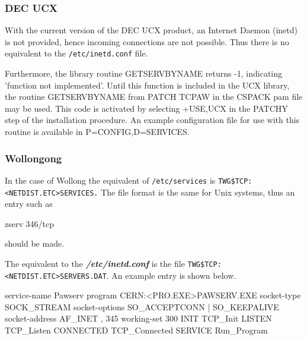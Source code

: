 \subsubsection{DEC UCX}
\par
With the current version of the DEC UCX product,
an Internet Daemon (inetd) is not provided,
hence incoming connections are not possible.
Thus there is no equivalent to the {\tt /etc/inetd.conf} file.
\par
Furthermore, the library routine GETSERVBYNAME
returns -1, indicating 'function not implemented'.
Until this function is included in the UCX library,
the routine GETSERVBYNAME from PATCH TCPAW in the CSPACK
pam file may be used. This code is activated by selecting
+USE,UCX in the PATCHY step of the installation procedure.
An example configuration file for use with this routine
is available in P=CONFIG,D=SERVICES.
\subsubsection{Wollongong}
\par
In the case of Wollong the equivalent of {\tt/etc/services} is
{\tt TWG\$TCP:<NETDIST.ETC>SERVICES.} The file format
is the same for Unix systems, thus an entry such as
\begin{XMP}
zserv 346/tcp
\end{XMP}
should be made.
\par
The equivalent to the {\bf\it /etc/inetd.conf} is the file
{\tt  TWG\$TCP:<NETDIST.ETC>SERVERS.DAT}. An example entry is
shown below.
\begin{XMP}
service-name    Pawserv
program         CERN:<PRO.EXE>PAWSERV.EXE
socket-type     SOCK_STREAM
socket-options  SO_ACCEPTCONN | SO_KEEPALIVE
socket-address  AF_INET , 345
working-set     300
INIT            TCP_Init
LISTEN          TCP_Listen
CONNECTED       TCP_Connected
SERVICE         Run_Program

\end{XMP}
